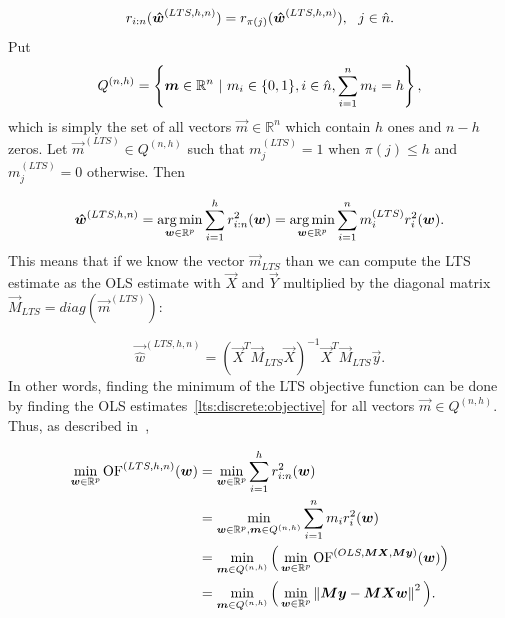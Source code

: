 \begin{equation}
    r_{i:n}(\vec{\hat{w}}^{(LTS,h, n)}) = r_{\pi(j)}(\vec{\hat{w}}^{(LTS,h, n)})\\, \ \ j \in \hat{n}.
\end{equation}
Put
 \begin{equation}
   Q^{(n,h)} = \left\{ \vec{m} \in \mathbb{R}^n \ | \ m_i \in \{{0, 1\}} \\,i \in \hat{n} \\,   \sum\limits_{i=1}^n  m_i = h \right\},
\end{equation}
which is simply the set of all vectors $\vec{m} \in \mathbb{R}^n$ which contain $h$ ones and $n-h$ zeros. Let $\vec{m}^{(LTS)} \in Q^{(n,h)}$  such that  $m^{(LTS)}_j = 1$ when $\pi(j) \leq h$ and $m^{(LTS)}_j = 0$ otherwise. Then

\begin{equation} \label{ltshat}
    \vec{\hat{w}}^{(LTS,h, n)} =  
  \argmin_{\vec{w} \in \mathbb{R}^p} \sum\limits_{i=1}^h r_{i:n}^2(\vec{w}) = 
  \argmin_{\vec{w} \in \mathbb{R}^p} \sum\limits_{i=1}^n m^{(LTS)}_i r_{i}^2(\vec{w}). 
\end{equation}
This means that if we know the vector $\vec{m}_{LTS}$ than we can compute the LTS estimate as the OLS estimate with $\vec{X}$ and $\vec{Y}$ multiplied by the diagonal matrix $\vec{M}_{LTS} = diag(\vec{m}^{(LTS)})$:

\begin{equation}  \label{lts:discrete:objective}
    \vec{\hat{w}}^{(LTS,h, n)} = (\vec{X}^T\vec{M}_{LTS}\vec{X})^{-1}\vec{X}^T\vec{M}_{LTS}\vec{y}.
\end{equation}
In other words, finding the minimum of the LTS objective function can be done by finding the OLS estimates~\eqref{lts:discrete:objective} for all vectors 
$\vec{m} \in Q^{(n,h)}$. 
Thus, as described in~\cite{kloudaVyzkumnyUkol},




\begin{align} \label{kloudaodvozeni}
\minim_{\vec{w} \in \mathbb{R}^p} 
    \of^{(LTS,h, n)}(\vec{w})  
&=\minim_{\vec{w} \in \mathbb{R}^p} 
    \sum\limits_{i=1}^h r_{i:n}^2(\vec{w})  \\
&= \minim_{\vec{w} \in \mathbb{R}^p,\vec{m} \in Q^{(n,h)}} 
        \sum\limits_{i=1}^n m_i r_{i}^2(\vec{w})\\
&= \minim_{\vec{m} \in Q^{(n,h)}} 
            \Big( \minim_{\vec{w} \in\mathbb{R}^p} 
            \of^{(OLS,\vec{M}\vec{X},  \vec{M}\vec{y} )} (\vec{w}) \Big)\\
&= \minim_{\vec{m} \in Q^{(n,h)}} 
            \Big(\minim_{\vec{w} \in\mathbb{R}^p}  
            \norm{ \vec{M}\vec{y} -   \vec{M}\vec{X}\vec{w}  }^2 \Big).
\end{align}


